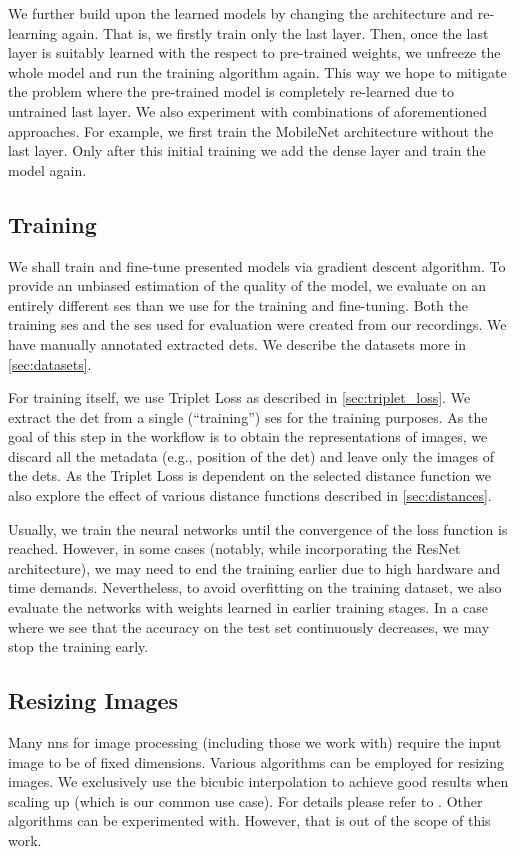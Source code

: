 We further build upon the learned models by changing the architecture and re-learning again. That is, we firstly train only the last layer. Then, once the last layer is suitably learned with the respect to pre-trained weights, we unfreeze the whole model and run the training algorithm again. This way we hope to mitigate the problem where the pre-trained model is completely re-learned due to untrained last layer. We also experiment with combinations of aforementioned approaches. For example, we first train the MobileNet architecture without the last layer. Only after this initial training we add the dense layer and train the model again.

\subsection{Training}

We shall train and fine-tune presented models via gradient descent algorithm. To provide an unbiased estimation of the quality of the model, we evaluate on an entirely different \gls{ses} than we use for the training and fine-tuning. Both the training \gls{ses} and the \gls{ses} used for evaluation were created from our recordings. We have manually annotated extracted \glspl{det}. We describe the datasets more in \autoref{sec:datasets}.

For training itself, we use Triplet Loss as described in \autoref{sec:triplet_loss}. We extract the \gls{det} from a single (``training'') \gls{ses} for the training purposes. As the goal of this step in the workflow is to obtain the representations of images, we discard all the metadata (e.g., position of the \gls{det}) and leave only the images of the \glspl{det}. As the Triplet Loss is dependent on the selected distance function we also explore the effect of various distance functions described in \autoref{sec:distances}.

Usually, we train the neural networks until the convergence of the loss function is reached. However, in some cases (notably, while incorporating the ResNet architecture), we may need to end the training earlier due to high hardware and time demands. Nevertheless, to avoid overfitting on the training dataset, we also evaluate the networks with weights learned in earlier training stages. In a case where we see that the accuracy on the test set continuously decreases, we may stop the training early.

\subsection{Resizing Images}

\label{ssec:resizing}

Many \glspl{nn} for image processing (including those we work with) require the input image to be of fixed dimensions. Various algorithms can be employed for resizing images. We exclusively use the bicubic interpolation to achieve good results when scaling up (which is our common use case). For details please refer to \cite{keys1981cubic}. Other algorithms can be experimented with. However, that is out of the scope of this work.